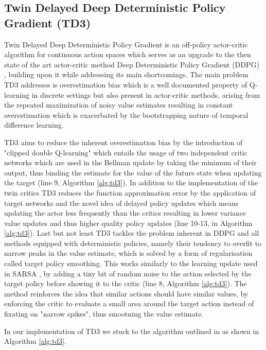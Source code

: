 \documentclass{article}
\begin{document}
\subsection{Twin Delayed Deep Deterministic Policy Gradient (TD3)}
\label{sec:td3}
Twin Delayed Deep Deterministic Policy Gradient is an off-policy actor-critic algorithm \citep{fujimoto2018addressing} for continuous action spaces which serves as an upgrade to the then state of the art actor-critic method Deep Deterministic Policy Gradient (DDPG) \citep{lillicrap2019continuouscontroldeepreinforcement}, building upon it while addressing its main shortcomings. The main problem TD3 addresses is overestimation bias which is a well documented property of Q-learning in discrete settings \citep{thrun2014issues} but also present in actor-critic methods, arising from the repeated maximization of noisy value estimates resulting in constant overestimation which is exacerbated by the bootstrapping nature of temporal difference learning. 

TD3 aims to reduce the inherent overestimation bias by the introduction of "clipped double Q-learning" which entails the usage of two independent critic networks which are used in the Bellman update by taking the minimum of their output, thus binding the estimate for the value of the future state when updating the target (line 9, Algorithm \ref{alg:td3}). In addition to the implementation of the twin critics TD3 reduces the function approximation error by the application of target networks \citep{mnih2015human} and the novel idea of delayed policy updates which means updating the actor less frequently than the critics resulting in lower variance value updates and thus higher quality policy updates (line 10-13, in Algorithm \ref{alg:td3}). Last but not least TD3 tackles the problem inherent in DDPG and all methods equipped with deterministic policies, namely their tendency to overfit to narrow peaks in the value estimate, which is solved by a form of regularisation called target policy smoothing. This works similarly to the learning update used in SARSA \citep{sutton1998reinforcement}, by adding a tiny bit of random noise to the action selected by the target policy before showing it to the critic (line 8, Algorithm \ref{alg:td3}). The method reinforces the idea that similar actions should have similar values, by enforcing the critic to evaluate a small area around the target action instead of fixating on "narrow spikes", thus smootning the value estimate.

In our implementation of TD3 we stuck to the algorithm outlined in \citep{fujimoto2018addressing} as shown in Algorithm \ref{alg:td3}.
\end{document}
